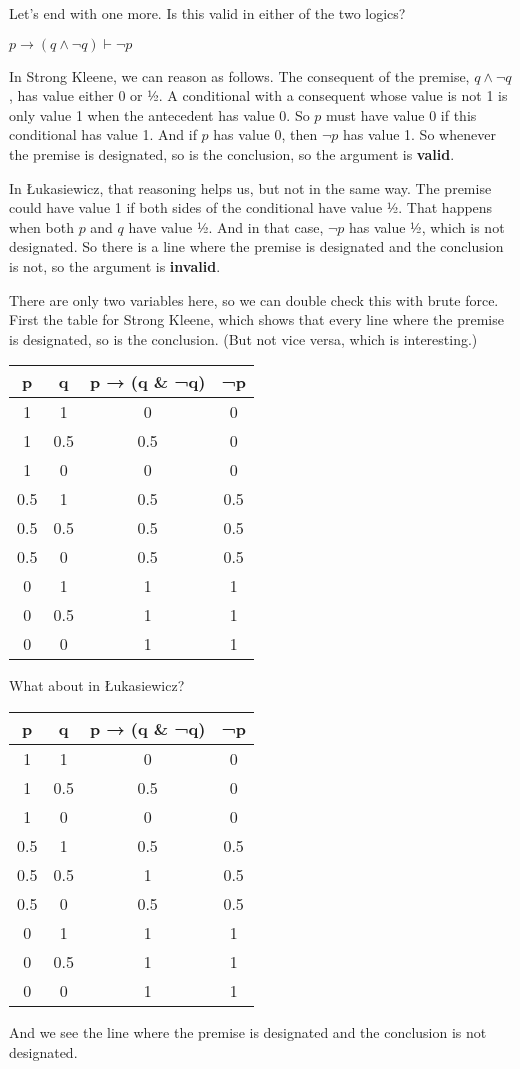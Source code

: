 \documentclass[
]{article}
\begin{document}
Let's end with one more. Is this valid in either of the two logics?

\(p \rightarrow (q \wedge \neg q) \vdash \neg p\)

In Strong Kleene, we can reason as follows. The consequent of the
premise, \(q \wedge \neg q\), has value either 0 or ½. A conditional
with a consequent whose value is not 1 is only value 1 when the
antecedent has value 0. So \(p\) must have value 0 if this conditional
has value 1. And if \(p\) has value 0, then \(\neg p\) has value 1. So
whenever the premise is designated, so is the conclusion, so the
argument is \textbf{valid}.

In Łukasiewicz, that reasoning helps us, but not in the same way. The
premise could have value 1 if both sides of the conditional have value
½. That happens when both \(p\) and \(q\) have value ½. And in that
case, \(\neg p\) has value ½, which is not designated. So there is a
line where the premise is designated and the conclusion is not, so the
argument is \textbf{invalid}.

\newpage

There are only two variables here, so we can double check this with
brute force. First the table for Strong Kleene, which shows that every
line where the premise is designated, so is the conclusion. (But not
vice versa, which is interesting.)

\begin{longtable}[]{@{}cccc@{}}
\toprule()
p & q & p → (q \& ¬q) & ¬p \\
\midrule()
\endhead
1 & 1 & 0 & 0 \\
1 & 0.5 & 0.5 & 0 \\
1 & 0 & 0 & 0 \\
0.5 & 1 & 0.5 & 0.5 \\
0.5 & 0.5 & 0.5 & 0.5 \\
0.5 & 0 & 0.5 & 0.5 \\
0 & 1 & 1 & 1 \\
0 & 0.5 & 1 & 1 \\
0 & 0 & 1 & 1 \\
\bottomrule()
\end{longtable}

What about in Łukasiewicz?

\begin{longtable}[]{@{}cccc@{}}
\toprule()
p & q & p → (q \& ¬q) & ¬p \\
\midrule()
\endhead
1 & 1 & 0 & 0 \\
1 & 0.5 & 0.5 & 0 \\
1 & 0 & 0 & 0 \\
0.5 & 1 & 0.5 & 0.5 \\
0.5 & 0.5 & 1 & 0.5 \\
0.5 & 0 & 0.5 & 0.5 \\
0 & 1 & 1 & 1 \\
0 & 0.5 & 1 & 1 \\
0 & 0 & 1 & 1 \\
\bottomrule()
\end{longtable}

And we see the line where the premise is designated and the conclusion
is not designated.
\end{document}
